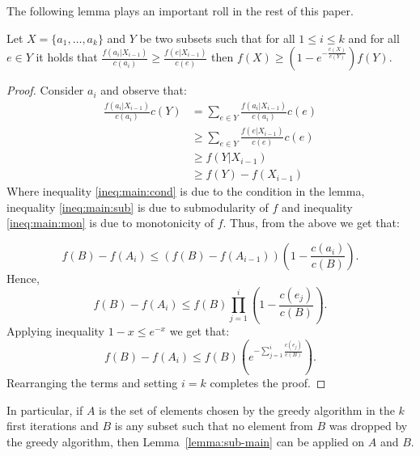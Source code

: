 The following lemma plays an important roll in the rest of this paper.

\begin{lemma}
\label{lemma:sub-main}
Let $X = \{a_1, \dots, a_k\}$ and $Y$ be two subsets such that for all $1 \leq i \leq k$ 
and for all $e \in Y$ it holds that 
$\frac{f(a_i|X_{i-1})}{c(a_i)} \geq \frac{f(e|X_{i-1})}{c(e)}$
then $f(X) \geq (1 - e^{-\frac{c(X)}{c(Y)}})f(Y)$.
\end{lemma} 

\begin{proof}
Consider $a_i$ and observe that:
\begin{align}
	\frac{f(a_i|X_{i-1})}{c(a_i)}c(Y) 
	& = \sum_{e \in Y} \frac{f(a_i|X_{i-1})}{c(a_i)}c(e)
	\nonumber
	\\ 	& \geq \sum_{e \in Y} \frac{f(e|X_{i-1})}{c(e)}c(e)
	\label{ineq:main:cond}
	\\	& \geq f(Y|X_{i-1})
	\label{ineq:main:sub}
	\\ 	& \geq f(Y) - f(X_{i-1})
	\label{ineq:main:mon}
\end{align}
Where inequality \ref{ineq:main:cond} is due to the condition in the lemma, inequality \ref{ineq:main:sub} is due to submodularity of $f$ and inequality \ref{ineq:main:mon} is due to monotonicity of $f$.
Thus, from the above we get that:

$$
f(B) - f(A_i)  \leq (f(B) - f(A_{i - 1}))
\left(1 - \frac{c(a_i)}{c(B)}\right).
$$
Hence,
$$
f(B) - f(A_i)  \leq f(B) \prod_{j = 1}^{i}
\left(1 - \frac{c(e_j)}{c(B)}\right).
$$
Applying inequality $1 - x \leq e^{-x}$ we get that:
$$
f(B) - f(A_i)  \leq f(B) 
\left(e^{-\sum_{j = 1}^{i}\frac{c(e_j)}{c(B)}}\right).
$$
Rearranging the terms and setting $i = k$ completes the proof.
\end{proof}

In particular, if $A$ is the set of elements chosen by the greedy algorithm in 
the $k$ first iterations and $B$ is any subset such that no element from $B$ was dropped
by the greedy algorithm, 
then Lemma~\ref{lemma:sub-main} can be applied on $A$ and $B$.   




